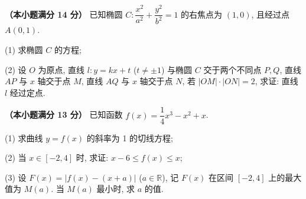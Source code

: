 \begin{question}
\textbf{（本小题满分 14 分）} 
已知椭圆 $C: \dfrac{x^2}{a^2} + \dfrac{y^2}{b^2} = 1$ 的右焦点为 $(1, 0)$, 且经过点 $A(0, 1)$.

(1) 求椭圆 $C$ 的方程;

(2) 设 $O$ 为原点, 直线 $l: y = kx + t$ ($t \neq \pm 1$) 与椭圆 $C$ 交于两个不同点 $P, Q$, 直线 $AP$ 与 $x$ 轴交于点 $M$, 直线 $AQ$ 与 $x$ 轴交于点 $N$, 若 $|OM| \cdot |ON| = 2$, 求证: 直线 $l$ 经过定点.

\end{question}
\begin{question}
\textbf{（本小题满分 13 分）} 
已知函数 $f(x) = \dfrac{1}{4}x^3 - x^2 + x$.

(1) 求曲线 $y = f(x)$ 的斜率为 1 的切线方程;

(2) 当 $x \in [-2, 4]$ 时, 求证: $x - 6 \leqslant f(x) \leqslant x$;

(3) 设 $F(x) = |f(x) - (x + a)|$ ($a \in \mathbb{R}$), 记 $F(x)$ 在区间 $[-2, 4]$ 上的最大值为 $M(a)$. 当 $M(a)$ 最小时, 求 $a$ 的值.

\end{question}